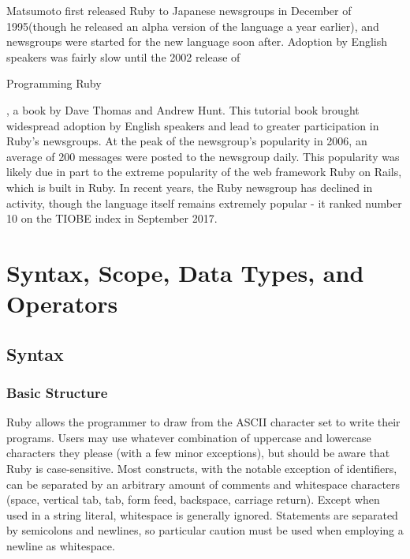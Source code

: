 \documentclass[12pt]{article}
\begin{document}
Matsumoto first released Ruby to Japanese newsgroups in December of 1995(though he released an alpha version of the language a year earlier), and newsgroups were started for the new language soon after\cite{earlyhistmatz}\cite{rubyinterview}. Adoption by English speakers was fairly slow until the 2002 release of \begin{it}Programming Ruby\end{it}, a book by Dave Thomas and Andrew Hunt. This tutorial book brought widespread adoption by English speakers and lead to greater participation in Ruby's newsgroups. At the peak of the newsgroup's popularity in 2006, an average of 200 messages were posted to the newsgroup daily\cite{generalRb}. This popularity was likely due in part to the extreme popularity of the web framework Ruby on Rails, which is built in Ruby. In recent years, the Ruby newsgroup has declined in activity, though the language itself remains extremely popular - it ranked number 10 on the TIOBE index in September 2017\cite{tiobe2017}.





\pagebreak

\section{Syntax, Scope, Data Types, and Operators}

\subsection{Syntax}
\subsubsection{Basic Structure}
Ruby allows the programmer to draw from the ASCII character set to write their programs. Users may use whatever combination of uppercase and lowercase characters they please (with a few minor exceptions), but should be aware that Ruby is case-sensitive. Most constructs, with the notable exception of identifiers, can be separated by an arbitrary amount of comments and whitespace characters (space, vertical tab, tab, form feed, backspace, carriage return). Except when used in a string literal, whitespace is generally ignored. Statements are separated by semicolons and newlines, so particular caution must be used when employing a newline as whitespace\cite{huihoo}.
\end{document}
